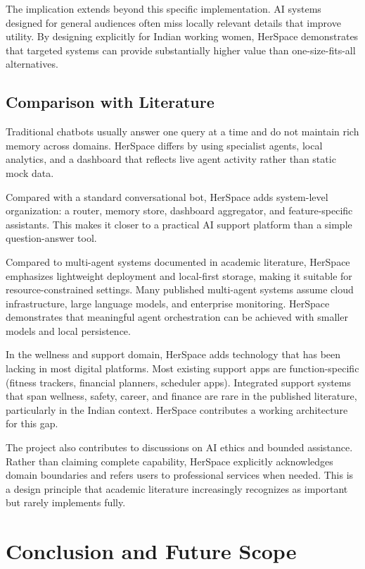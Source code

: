 \documentclass[oneside,a4paper,12pt]{report}
\begin{document}
The implication extends beyond this specific implementation. AI systems designed for general audiences often miss locally relevant details that improve utility. By designing explicitly for Indian working women, HerSpace demonstrates that targeted systems can provide substantially higher value than one-size-fits-all alternatives.

\section{Comparison with Literature}
Traditional chatbots usually answer one query at a time and do not maintain rich memory across domains. HerSpace differs by using specialist agents, local analytics, and a dashboard that reflects live agent activity rather than static mock data.

Compared with a standard conversational bot, HerSpace adds system-level organization: a router, memory store, dashboard aggregator, and feature-specific assistants. This makes it closer to a practical AI support platform than a simple question-answer tool.

Compared to multi-agent systems documented in academic literature, HerSpace emphasizes lightweight deployment and local-first storage, making it suitable for resource-constrained settings. Many published multi-agent systems assume cloud infrastructure, large language models, and enterprise monitoring. HerSpace demonstrates that meaningful agent orchestration can be achieved with smaller models and local persistence.

In the wellness and support domain, HerSpace adds technology that has been lacking in most digital platforms. Most existing support apps are function-specific (fitness trackers, financial planners, scheduler apps). Integrated support systems that span wellness, safety, career, and finance are rare in the published literature, particularly in the Indian context. HerSpace contributes a working architecture for this gap.

The project also contributes to discussions on AI ethics and bounded assistance. Rather than claiming complete capability, HerSpace explicitly acknowledges domain boundaries and refers users to professional services when needed. This is a design principle that academic literature increasingly recognizes as important but rarely implements fully.

\chapter{Conclusion and Future Scope}
\end{document}
